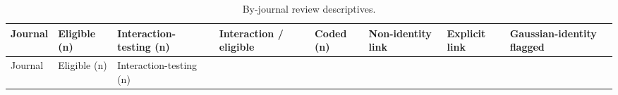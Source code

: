 \documentclass[
  man,
  floatsintext,
  longtable,
  nolmodern,
  notxfonts,
  notimes,
  colorlinks=true,linkcolor=blue,citecolor=blue,urlcolor=blue]{apa7}
\begin{document}
\begin{longtable}[]{@{}
  >{\raggedright\arraybackslash}p{}
  >{\raggedleft\arraybackslash}p{}
  >{\raggedleft\arraybackslash}p{}
  >{\raggedright\arraybackslash}p{}
  >{\raggedleft\arraybackslash}p{}
  >{\raggedright\arraybackslash}p{}
  >{\raggedright\arraybackslash}p{}
  >{\raggedright\arraybackslash}p{}@{}}
\caption{By-journal review
descriptives.}\label{tbl-by-journal}\tabularnewline
\toprule\noalign{}
\begin{minipage}[b]{\linewidth}\raggedright
Journal
\end{minipage} & \begin{minipage}[b]{\linewidth}\raggedleft
Eligible (n)
\end{minipage} & \begin{minipage}[b]{\linewidth}\raggedleft
Interaction-testing (n)
\end{minipage} & \begin{minipage}[b]{\linewidth}\raggedright
Interaction / eligible
\end{minipage} & \begin{minipage}[b]{\linewidth}\raggedleft
Coded (n)
\end{minipage} & \begin{minipage}[b]{\linewidth}\raggedright
Non-identity link
\end{minipage} & \begin{minipage}[b]{\linewidth}\raggedright
Explicit link
\end{minipage} & \begin{minipage}[b]{\linewidth}\raggedright
Gaussian-identity flagged
\end{minipage} \\
\midrule\noalign{}
\endfirsthead
\toprule\noalign{}
\begin{minipage}[b]{\linewidth}\raggedright
Journal
\end{minipage} & \begin{minipage}[b]{\linewidth}\raggedleft
Eligible (n)
\end{minipage} & \begin{minipage}[b]{\linewidth}\raggedleft
Interaction-testing (n)
\end{minipage} & \begin{minipage}[b]{\linewidth}\raggedright

\end{minipage}
\end{longtable}
\end{document}
